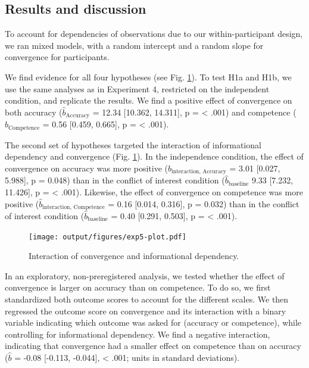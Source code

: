 \documentclass[
  doc,floatsintext]{apa6}
\begin{document}
\subsection{Results and discussion}\label{results-and-discussion-4}

To account for dependencies of observations due to our within-participant design, we ran mixed models, with a random intercept and a random slope for convergence for participants.

We find evidence for all four hypotheses (see Fig. \ref{fig:exp5-plot}). To test H1a and H1b, we use the same analyses as in Experiment 4, restricted on the independent condition, and replicate the results. We find a positive effect of convergence on both accuracy (\(\hat{b}_{\text{Accuracy}}\) = 12.34 {[}10.362, 14.311{]}, p = \textless{} .001) and competence (\(\hat{b}_{\text{Competence}}\) = 0.56 {[}0.459, 0.665{]}, p = \textless{} .001).

The second set of hypotheses targeted the interaction of informational dependency and convergence (Fig. \ref{fig:exp5-plot}). In the independence condition, the effect of convergence on accuracy was more positive (\(\hat{b}_{\text{interaction, Accuracy}}\) = 3.01 {[}0.027, 5.988{]}, p = 0.048) than in the conflict of interest condition (\(\hat{b}_{\text{baseline}}\) 9.33 {[}7.232, 11.426{]}, p = \textless{} .001). Likewise, the effect of convergence on competence was more positive (\(\hat{b}_{\text{interaction, Competence}}\) = 0.16 {[}0.014, 0.316{]}, p = 0.032) than in the conflict of interest condition (\(\hat{b}_{\text{baseline}}\) = 0.40 {[}0.291, 0.503{]}, p = \textless{} .001).



\begin{figure}
\centering
\texttt{[image: output/figures/exp5-plot.pdf]}
\caption{\label{fig:exp5-plot}Interaction of convergence and informational dependency.}
\end{figure}

In an exploratory, non-preregistered analysis, we tested whether the effect of convergence is larger on accuracy than on competence. To do so, we first standardized both outcome scores to account for the different scales. We then regressed the outcome score on convergence and its interaction with a binary variable indicating which outcome was asked for (accuracy or competence), while controlling for informational dependency. We find a negative interaction, indicating that convergence had a smaller effect on competence than on accuracy (\(\hat{b}\) = -0.08 {[}-0.113, -0.044{]}, \textless{} .001; units in standard deviations).
\end{document}

